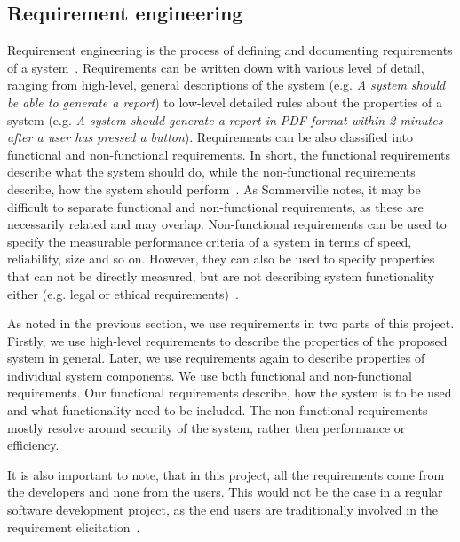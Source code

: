 \subsection{Requirement engineering}

Requirement engineering is the process of defining and documenting requirements of a system~\cite{Sommerville2011SoftwareEngineering}. Requirements can be written down with various level of detail, ranging from high-level, general descriptions of the system (e.g. \textit{A system should be able to generate a report}) to low-level detailed rules about the properties of a system (e.g. \textit{A system should generate a report in PDF format within 2 minutes after a user has pressed a button}). Requirements can be also classified into functional and non-functional requirements. In short, the functional requirements describe what the system should do, while the non-functional requirements describe, how the system should perform~\cite{Sommerville2011SoftwareEngineering}. As Sommerville notes, it may be difficult to separate functional and non-functional requirements, as these are necessarily related and may overlap. Non-functional requirements can be used to specify the measurable performance criteria of a system in terms of speed, reliability, size and so on. However, they can also be used to specify properties that can not be directly measured, but are not describing system functionality either (e.g. legal or ethical requirements)~\cite{Sommerville2011SoftwareEngineering}. 

As noted in the previous section, we use requirements in two parts of this project. Firstly, we use high-level requirements to describe the properties of the proposed system in general. Later, we use requirements again to describe properties of individual system components. We use both functional and non-functional requirements. Our functional requirements describe, how the system is to be used and what functionality need to be included. The non-functional requirements mostly resolve around security of the system, rather then performance or efficiency.

It is also important to note, that in this project, all the requirements come from the developers and none from the users. This would not be the case in a regular software development project, as the end users are traditionally involved in the requirement elicitation~\cite{Kujala2005TheSuccess}.